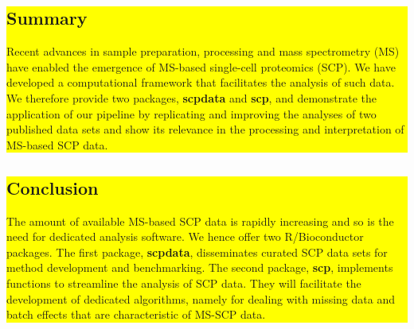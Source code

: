 \documentclass{article}
\newcommand{\hcode}[2][lgray]{{\ttfamily\color{vdgray}\colorbox{#1}{#2}}}
\begin{document}
\noindent
\colorbox{yellow}{
  \noindent
  \begin{minipage}[t]{13.7cm}
    \vspace{.15cm}
    \section*{\huge Summary}
    \large 
      Recent advances in sample preparation, processing and mass
      spectrometry (MS) have enabled the emergence of MS-based
      single-cell proteomics (SCP). We have developed a computational
      framework that facilitates the analysis of such data. We 
      therefore provide two packages, \textbf{\hcode[yellow]{scpdata}} 
      and \textbf{\hcode[yellow]{scp}}, and demonstrate the application
      of our pipeline by replicating and improving the analyses of two 
      published data sets and show its relevance in the processing and 
      interpretation of MS-based SCP data.
    \vspace{0.1cm}
  \end{minipage}
}
\hspace{0.37cm}
\noindent
\colorbox{yellow}{
  \begin{minipage}[t]{13.6cm}
    \vspace{.2cm}
    \section*{\huge Conclusion}
    \large
      The amount of available MS-based SCP data is rapidly increasing 
      and so is the need for dedicated analysis software. We hence 
      offer two R/Bioconductor packages. The first package, \textbf{\hcode[yellow]{scpdata}}, 
      disseminates curated SCP data sets for method development and 
      benchmarking. The second package, \textbf{\hcode[yellow]{scp}}, 
      implements functions to streamline the analysis of SCP data. 
      They will facilitate the development of dedicated algorithms, 
      namely for dealing with missing data and batch effects that are 
      characteristic of MS-SCP data.
    \vspace{0.15cm}
 \end{minipage}
}
\vspace{-1cm}
\end{document}
